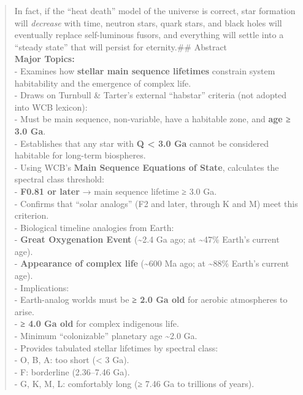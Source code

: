 \documentclass[
  letterpaper,
]{book}
\begin{document}
\begin{quote}
In fact, if the ``heat death'' model of the universe is correct, star
formation will \emph{decrease} with time, neutron stars, quark stars,
and black holes will eventually replace self-luminous fusors, and
everything will settle into a ``steady state'' that will persist for
eternity.\#\# Abstract\\
\textbf{Major Topics:}\\
- Examines how \textbf{stellar main sequence lifetimes} constrain system
habitability and the emergence of complex life.\\
- Draws on Turnbull \& Tarter's external ``habstar'' criteria (not
adopted into WCB lexicon):\\
- Must be main sequence, non-variable, have a habitable zone, and
\textbf{age ≥ 3.0 Ga}.\\
- Establishes that any star with \textbf{Q \textless{} 3.0 Ga} cannot be
considered habitable for long-term biospheres.\\
- Using WCB's \textbf{Main Sequence Equations of State}, calculates the
spectral class threshold:\\
- \textbf{F0.81 or later} → main sequence lifetime ≥ 3.0 Ga.\\
- Confirms that ``solar analogs'' (F2 and later, through K and M) meet
this criterion.\\
- Biological timeline analogies from Earth:\\
- \textbf{Great Oxygenation Event} (\textasciitilde2.4 Ga ago; at
\textasciitilde47\% Earth's current age).\\
- \textbf{Appearance of complex life} (\textasciitilde600 Ma ago; at
\textasciitilde88\% Earth's current age).\\
- Implications:\\
- Earth-analog worlds must be \textbf{≥ 2.0 Ga old} for aerobic
atmospheres to arise.\\
- \textbf{≥ 4.0 Ga old} for complex indigenous life.\\
- Minimum ``colonizable'' planetary age \textasciitilde2.0 Ga.\\
- Provides tabulated stellar lifetimes by spectral class:\\
- O, B, A: too short (\textless{} 3 Ga).\\
- F: borderline (2.36--7.46 Ga).\\
- G, K, M, L: comfortably long (≥ 7.46 Ga to trillions of years).
\end{quote}
\end{document}
